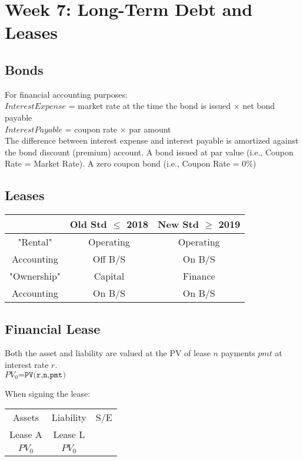 \section*{Week 7: Long-Term Debt and Leases}

\subsection*{Bonds}

For financial accounting purposes: \\
$Interest Expense$ = market rate at the time the bond is issued × net bond payable \\
$Interest Payable$ = coupon rate × par amount \\
The difference between interest expense and interest payable is amortized against the bond discount (premium) account.
A bond issued at par value (i.e., Coupon Rate = Market Rate).
A zero coupon bond (i.e., Coupon Rate = 0\%)

\subsection*{Leases}


	\begin{tabular}{ |c|c|c| } 
	\hline
	& Old Std $\leq$ 2018 & New Std $\geq$ 2019 \\ 
	\hline
	"Rental" & Operating & Operating \\ 
	Accounting & Off B/S & On B/S \\ 
	\hline
	"Ownership" & Capital & Finance \\ 
	Accounting & On B/S & On B/S \\ 
	\hline
	\end{tabular}

\subsection*{Financial Lease} 

 Both the asset and liability are valued at the PV of lease $n$ payments $pmt$ at interest rate $r$. \\
 $PV_0\texttt{=PV(r,n,pmt)}$ 
 
 When signing the lease:\\
 	\begin{tabular}{ |c||c|c| } 
 	\hline
 	Assets  & Liability  & S/E \\ 
 	Lease A & Lease L  &  \\ 
 	\hline
 	$PV_0$ & $PV_0$  &  \\ 
 	\hline
 \end{tabular}

